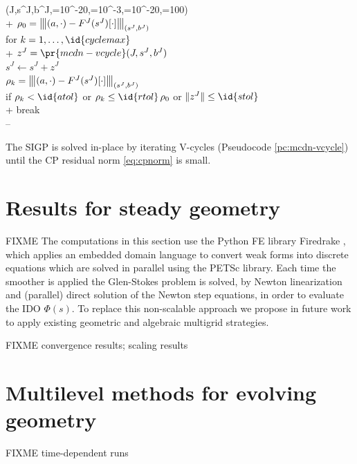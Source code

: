 \documentclass[letterpaper,final,12pt,reqno]{amsart}
\theoremstyle{claim}
\newcommand{\vertiii}[1]{{\left\vert\kern-0.25ex\left\vert\kern-0.25ex\left\vert #1 \right\vert\kern-0.25ex\right\vert\kern-0.25ex\right\vert}}
\numberwithin{equation}{section}
\numberwithin{figure}{section}
\numberwithin{table}{section}
\numberwithin{theorem}{section}
\begin{document}
\begin{pcode}[ht]
\begin{pseudo*}
(J,s^J,b^J,=10^{-20},=10^{-3},=10^{-20},=100)\text{:} \\+
    $\rho_0=\vertiii{(a,\cdot) - F^J(s^J)[\cdot]}_{(s^J,b^J)}$ \\
    for $k=1,\dots,\id{cyclemax}$ \\+
        $z^J = \pr{mcdn-vcycle}(J,s^J,b^J)$ \\
        $s^J \gets s^J + z^J$ \\
        $\rho_k=\vertiii{(a,\cdot) - F^J(s^J)[\cdot]}_{(s^J,b^J)}$ \\
        if $\rho_k < \id{atol}$ or $\rho_k \le \id{rtol} \, \rho_0$ or $\|z^J\| \le \id{stol}$ \\+
            break \\--
\end{pseudo*}
\caption{The SIGP is solved in-place by iterating V-cycles (Pseudocode \ref{pc:mcdn-vcycle}) until the CP residual norm \eqref{eq:cpnorm} is small.}
\label{pc:mcdn-solver}
\end{pcode}


\section{Results for steady geometry} \label{sec:results}

FIXME The computations in this section use the Python FE library Firedrake \cite{Rathgeberetal2016}, which applies an embedded domain language \cite{Alnaesetal2014} to convert weak forms into discrete equations which are solved in parallel using the PETSc \cite{Balayetal2020} library.  Each time the smoother is applied the Glen-Stokes problem is solved, by Newton linearization and (parallel) direct solution of the Newton step equations, in order to evaluate the IDO $\Phi(s)$.  To replace this non-scalable approach we propose in future work to apply existing geometric \cite{BrownSmithAhmadia2013,IsaacStadlerGhattas2015} and algebraic \cite{Tuminaroetal2016} multigrid strategies.

FIXME convergence results; scaling results


\section{Multilevel methods for evolving geometry} \label{sec:evolution}

FIXME time-dependent runs
\end{document}
